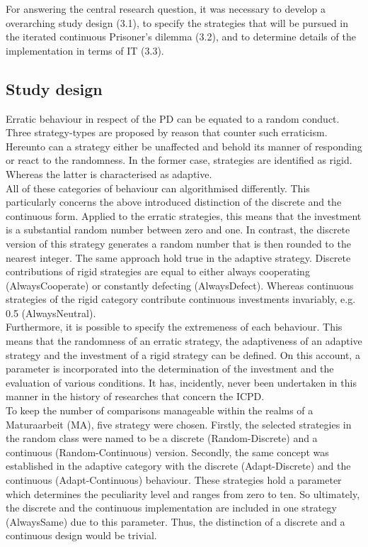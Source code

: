 \documentclass[11pt]{article}
\begin{document}
For answering the central research question, it was necessary to develop a overarching study design (3.1), to specify the strategies that will be pursued in the iterated continuous Prisoner’s dilemma (3.2), and to determine details of the implementation in terms of IT (3.3).

\subsection{Study design}

Erratic behaviour in respect of the PD can be equated to a random conduct.
Three strategy-types are proposed by reason that counter such erraticism.
Hereunto can a strategy either be unaffected and behold its manner of responding or react to the randomness.
In the former case, strategies are identified as rigid.
Whereas the latter is characterised as adaptive.\\

All of these categories of behaviour can algorithmised differently.
This particularly concerns the above introduced distinction of the discrete and the continuous form.
Applied to the erratic strategies, this means that the investment is a substantial random number between zero and one.
In contrast, the discrete version of this strategy generates a random number that is then rounded to the nearest integer.
The same approach hold true in the adaptive strategy.
Discrete contributions of rigid strategies are equal to either always cooperating (AlwaysCooperate) or constantly defecting (AlwaysDefect).
Whereas continuous strategies of the rigid category contribute continuous investments invariably, e.g. 0.5 (AlwaysNeutral).\\

Furthermore, it is possible to specify the extremeness of each behaviour.
This means that the randomness of an erratic strategy, the adaptiveness of an adaptive strategy and the investment of a rigid strategy can be defined.
On this account, a parameter is incorporated into the determination of the investment and the evaluation of various conditions.
It has, incidently, never been undertaken in this manner in the history of researches that concern the ICPD.\\

To keep the number of comparisons manageable within the realms of a Maturaarbeit (MA), five strategy were chosen.
Firstly, the selected strategies in the random class were named to be a discrete (Random-Discrete) and a continuous (Random-Continuous) version.
Secondly, the same concept was established in the adaptive category with the discrete (Adapt-Discrete) and the continuous (Adapt-Continuous) behaviour.
These strategies hold a parameter which determines the peculiarity level and ranges from zero to ten.
So ultimately, the discrete and the continuous implementation are included in one strategy (AlwaysSame) due to this parameter.
Thus, the distinction of a discrete and a continuous design would be trivial.\\
\end{document}
